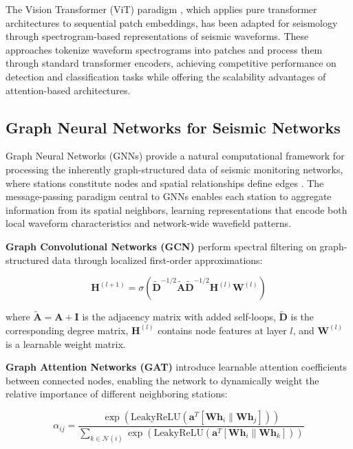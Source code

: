\documentclass[review,authoryear]{elsarticle}
\begin{document}
The Vision Transformer (ViT) paradigm \citep{dosovitskiy2021image}, which applies pure transformer architectures to sequential patch embeddings, has been adapted for seismology through spectrogram-based representations of seismic waveforms. These approaches tokenize waveform spectrograms into patches and process them through standard transformer encoders, achieving competitive performance on detection and classification tasks while offering the scalability advantages of attention-based architectures.

\subsection{Graph Neural Networks for Seismic Networks}

Graph Neural Networks (GNNs) provide a natural computational framework for processing the inherently graph-structured data of seismic monitoring networks, where stations constitute nodes and spatial relationships define edges \citep{scarselli2009graph, bronstein2017geometric, wu2021comprehensive}. The message-passing paradigm central to GNNs enables each station to aggregate information from its spatial neighbors, learning representations that encode both local waveform characteristics and network-wide wavefield patterns.

\textbf{Graph Convolutional Networks (GCN)} \citep{kipf2017semi} perform spectral filtering on graph-structured data through localized first-order approximations:

\begin{equation}
\mathbf{H}^{(l+1)} = \sigma\left(\tilde{\mathbf{D}}^{-1/2}\tilde{\mathbf{A}}\tilde{\mathbf{D}}^{-1/2}\mathbf{H}^{(l)}\mathbf{W}^{(l)}\right)
\label{eq:gcn}
\end{equation}

\noindent where $\tilde{\mathbf{A}} = \mathbf{A} + \mathbf{I}$ is the adjacency matrix with added self-loops, $\tilde{\mathbf{D}}$ is the corresponding degree matrix, $\mathbf{H}^{(l)}$ contains node features at layer $l$, and $\mathbf{W}^{(l)}$ is a learnable weight matrix.

\textbf{Graph Attention Networks (GAT)} \citep{velickovic2018graph} introduce learnable attention coefficients between connected nodes, enabling the network to dynamically weight the relative importance of different neighboring stations:

\begin{equation}
\alpha_{ij} = \frac{\exp\left(\text{LeakyReLU}\left(\mathbf{a}^T[\mathbf{W}\mathbf{h}_i \| \mathbf{W}\mathbf{h}_j]\right)\right)}{\sum_{k \in \mathcal{N}(i)} \exp\left(\text{LeakyReLU}\left(\mathbf{a}^T[\mathbf{W}\mathbf{h}_i \| \mathbf{W}\mathbf{h}_k]\right)\right)}
\label{eq:gat}
\end{equation}
\end{document}
